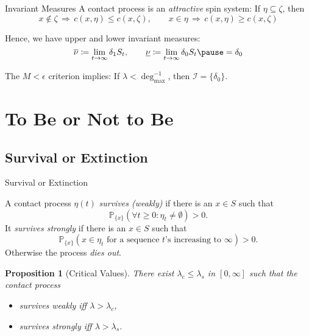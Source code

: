 \documentclass[envcountsect, aspectratio=149]{beamer}
\newtheorem{proposition}[theorem]{Proposition}
\renewcommand{\P}{\mathbb{P}}
\renewcommand{\[}{
	\setlength\abovedisplayskip{0.5ex}
	\setlength{\belowdisplayskip}{0.5ex}
	\setlength{\abovedisplayshortskip}{0.5ex}
	\setlength{\belowdisplayshortskip}{0.5ex}\begin{equation*}}
\begin{document}
	\begin{frame}{Invariant Measures}
		\pause
		A contact process is an \emph{attractive} spin system:
		If $\eta\subseteq \zeta$, then
			$$x \notin \zeta\, \Rightarrow\, c(x,\eta) \leq c(x,\zeta),\hspace{2em} x\in\eta \,\Rightarrow\, c(x,\eta) \geq c(x,\zeta) $$
			
		\bigskip\pause
		Hence, we have upper and lower invariant measures:
		$$\overline{\nu} \coloneqq \lim_{t\to\infty} \delta_1 S_t, \hspace{2em} \underline{\nu} \coloneqq \lim_{t\to\infty} \delta_0 S_t\pause = \delta_0 $$ 
		
		\bigskip\pause
		The $M<\epsilon$ criterion implies: If $\lambda < \deg_{\max}^{-1}$, then $\mathcal{I} = \{ \delta_0 \}$.
	\end{frame}
	
	\section{To Be or Not to Be}
	\subsection{Survival or Extinction}
	
	\begin{frame}{Survival or Extinction}
		\begin{definition}[Survival]
			A contact process $\eta(t)$ \emph{survives (weakly)} if there is an $x\in S$ such that $$\P_{\{x\}} (\forall t \geq0 : \eta_t \neq \emptyset) > 0.$$
			\pause
			It \emph{survives strongly} if there is an $x\in S$ such that
			$$\P_{\{x\}}(x\in\eta_t \text{ for a sequence $t$'s increasing to $\infty$})> 0.$$\pause
			Otherwise the process \emph{dies out}.
		\end{definition}
		\pause
		\begin{proposition}[Critical Values]
			There exist $\lambda_c \leq \lambda_s$ in $[0,\infty]$ such that the contact process
			\begin{itemize}[label=$\bullet$]
				\item survives weakly iff $\lambda > \lambda_c$,
				\item survives strongly iff $\lambda > \lambda_s$.
			\end{itemize}
		\end{proposition}
	\end{frame}
	
\end{document}

